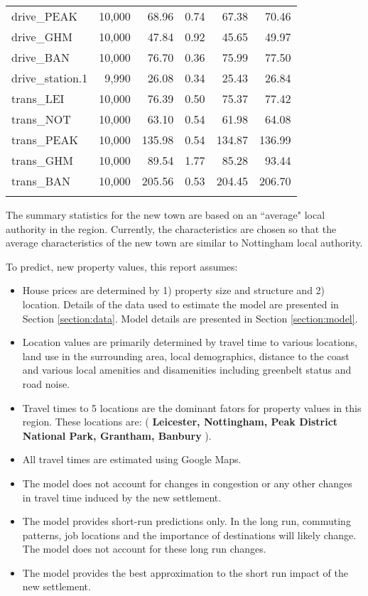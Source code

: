 \documentclass{article}\usepackage[]{graphicx}\usepackage[]{color}
\begin{document}
\begin{table}[!htbp]
\begin{tabular}{@{\extracolsep{5pt}}lD{.}{.}{-2} D{.}{.}{-2} D{.}{.}{-2} D{.}{.}{-2} D{.}{.}{-2} }
drive\_PEAK & 10,000 & 68.96 & 0.74 & 67.38 & 70.46 \\ 
drive\_GHM & 10,000 & 47.84 & 0.92 & 45.65 & 49.97 \\ 
drive\_BAN & 10,000 & 76.70 & 0.36 & 75.99 & 77.50 \\ 
drive\_station.1 & 9,990 & 26.08 & 0.34 & 25.43 & 26.84 \\ 
trans\_LEI & 10,000 & 76.39 & 0.50 & 75.37 & 77.42 \\ 
trans\_NOT & 10,000 & 63.10 & 0.54 & 61.98 & 64.08 \\ 
trans\_PEAK & 10,000 & 135.98 & 0.54 & 134.87 & 136.99 \\ 
trans\_GHM & 10,000 & 89.54 & 1.77 & 85.28 & 93.44 \\ 
trans\_BAN & 10,000 & 205.56 & 0.53 & 204.45 & 206.70 \\ 
\hline \\[-1.8ex] 
\end{tabular} 
\end{table} 


The summary statistics for the new town are based on an ``average" local authority in the region. Currently, the characteristics are chosen so that the average characteristics of the new town are similar to Nottingham local authority.

To predict, new property values, this report assumes:
\begin{itemize}
\item House prices are determined by 1) property size and structure and 2) location. Details of the data used to estimate the model are presented in Section \ref{section:data}. Model details are presented in Section \ref{section:model}.
\item Location values are primarily determined by travel time to various locations, land use in the surrounding area, local demographics, distance to the coast and various local amenities and disamenities including greenbelt status and road noise.  
\item Travel times to 5 locations are the dominant fators for property values in this region. These locations are: (\textbf{ Leicester, Nottingham, Peak District National Park, Grantham, Banbury} ).
\item All travel times are estimated using Google Maps.
\item The model does not account for changes in congestion or any other changes in travel time induced by the new settlement.
\item The model provides short-run predictions only. In the long run, commuting patterns, job locations and the importance of destinations will likely change. The model does not account for these long run changes.
\item The model provides the best approximation to the short run impact of the new settlement.
\end{itemize}
\end{document}
